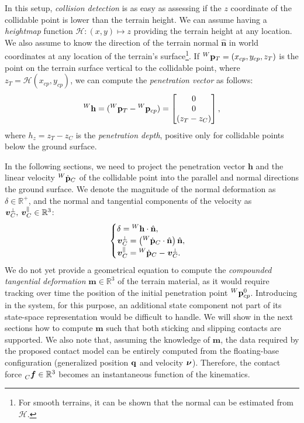 In this setup, \emph{collision detection} is as easy as assessing if the $z$ coordinate of the collidable point is lower than the terrain height.
We can assume having a \emph{heightmap} function $\mathcal{H}: (x, y) \mapsto z$ providing the terrain height at any location.
We also assume to know the direction of the terrain normal $\hat{\mathbf{n}}$ in world coordinates at any location of the terrain's surface\footnote{For smooth terrains, it can be shown that the normal can be estimated from $\mathcal{H}$.}.
If $\pos[W]_T = (x_{cp}, y_{cp}, z_T)$ is the point on the terrain surface vertical to the collidable point, where $z_T = \mathcal{H}(x_{cp}, y_{cp})$,
we can compute the \emph{penetration vector} as follows:
%
\begin{equation*}
    {}^W\mathbf{h} = (\pos[W]_T - \pos[W]_{cp}) = 
    \begin{bmatrix}
    0 \\ 0 \\ (z_T - z_C)
    \end{bmatrix}
    ,
\end{equation*}
%
where $h_z = z_T - z_C$ is the \emph{penetration depth}, positive only for collidable points below the ground surface.

In the following sections, we need to project the penetration vector $\mathbf{h}$ and the linear velocity $\posd[W]_C$ of the collidable point into the parallel and normal directions \wrt the ground surface.
We denote the magnitude of the normal deformation as $\delta \in \mathbb{R}^+$, and the normal and tangential components of the velocity as $\vellin_C^\perp,\, \vellin_C^\parallel \in \mathbb{R}^3$:
%
\begin{align*}
    \begin{cases}
        \delta = {}^W\mathbf{h} \cdot \hat{\mathbf{n}}, \\
        \vellin_C^\perp = \left(\posd[W]_C \cdot \hat{\mathbf{n}}\right) \hat{\mathbf{n}}, \\
        \vellin_C^\parallel = \posd[W]_C - \vellin_C^\perp
    .
    \end{cases}
\end{align*}
%
We do not yet provide a geometrical equation to compute the \emph{compounded tangential deformation} $\mathbf{m} \in \mathbb{R}^3$ of the terrain material, as it would require tracking over time the position of the initial penetration point $\pos[W]^0_{cp}$.
Introducing in the system, for this purpose, an additional state component not part of its state-space representation would be difficult to handle.
We will show in the next sections how to compute $\mathbf{m}$ such that both sticking and slipping contacts are supported.
We also note that, assuming the knowledge of $\mathbf{m}$, the data required by the proposed contact model can be entirely computed from the floating-base configuration (generalized position $\Qu$ and velocity $\Nu$).
Therefore, the contact force $\forcelin[C] \in \realn^3$ becomes an instantaneous function of the kinematics.

